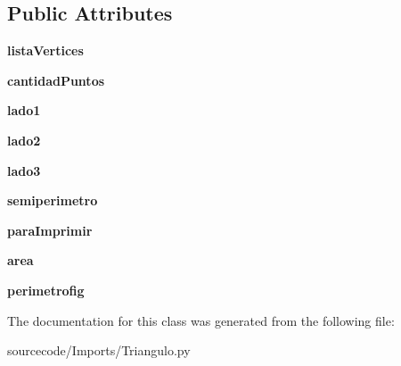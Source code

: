 \subsection*{Public Attributes}
\begin{DoxyCompactItemize}
\item 
\mbox{\label{class_imports_1_1_triangulo_1_1_escaleno_a615f0a7e5feeae2b6b3d6ef5403c21b1}} 
{\bfseries lista\+Vertices}
\item 
\mbox{\label{class_imports_1_1_triangulo_1_1_escaleno_a3e7efd227ba7657d73d27ceb4b3c8f1b}} 
{\bfseries cantidad\+Puntos}
\item 
\mbox{\label{class_imports_1_1_triangulo_1_1_escaleno_ad0866a76efcc9ab7e13d1357f02f9c0e}} 
{\bfseries lado1}
\item 
\mbox{\label{class_imports_1_1_triangulo_1_1_escaleno_aed236fc325b8b146986769f8b1dd0f78}} 
{\bfseries lado2}
\item 
\mbox{\label{class_imports_1_1_triangulo_1_1_escaleno_a0bfe4d73af2c7d73fe19d7a415b992a6}} 
{\bfseries lado3}
\item 
\mbox{\label{class_imports_1_1_triangulo_1_1_escaleno_a12f21275ccff3d7e1f65ef2253a15108}} 
{\bfseries semiperimetro}
\item 
\mbox{\label{class_imports_1_1_triangulo_1_1_escaleno_aca2f08b25c6ede79a159ab0f7bef6bfb}} 
{\bfseries para\+Imprimir}
\item 
\mbox{\label{class_imports_1_1_triangulo_1_1_escaleno_a28d15b5d137db947fc095da608677f13}} 
{\bfseries area}
\item 
\mbox{\label{class_imports_1_1_triangulo_1_1_escaleno_af8c4e825edc82d6d0a7777c76b2a35fc}} 
{\bfseries perimetrofig}
\end{DoxyCompactItemize}


The documentation for this class was generated from the following file\+:\begin{DoxyCompactItemize}
\item 
sourcecode/\+Imports/Triangulo.\+py\end{DoxyCompactItemize}

